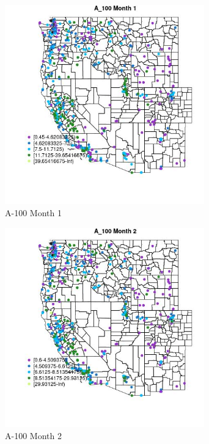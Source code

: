 \begin{figure} 
\centering  
\includegraphics[width=0.77\textwidth]{Code_Outputs/ML_input_report_ML_input_PM25_Step5_part_d_de_duplicated_aves_ML_input_MapObsMo1A_100.jpg} 
\caption{\label{fig:ML_input_report_ML_input_PM25_Step5_part_d_de_duplicated_aves_ML_inputMapObsMo1A_100}A-100 Month 1} 
\end{figure} 
 

\begin{figure} 
\centering  
\includegraphics[width=0.77\textwidth]{Code_Outputs/ML_input_report_ML_input_PM25_Step5_part_d_de_duplicated_aves_ML_input_MapObsMo2A_100.jpg} 
\caption{\label{fig:ML_input_report_ML_input_PM25_Step5_part_d_de_duplicated_aves_ML_inputMapObsMo2A_100}A-100 Month 2} 
\end{figure} 
 

